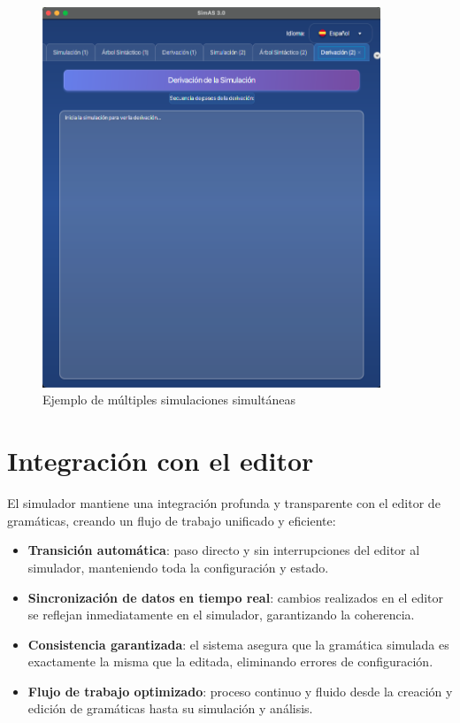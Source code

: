\needspace{8cm}
\begin{figure}[H]
    \centering
    \includegraphics[width=0.9\textwidth]{figuras/simulador/simulacion_varias.png}
    \caption{Ejemplo de múltiples simulaciones simultáneas}
    \label{fig:simulacion_varias}
\end{figure}

\section{Integración con el editor}

El simulador mantiene una integración profunda y transparente con el editor de gramáticas, creando un flujo de trabajo unificado y eficiente:

\begin{itemize}
    \item \textbf{Transición automática}: paso directo y sin interrupciones del editor al simulador, manteniendo toda la configuración y estado.
    \item \textbf{Sincronización de datos en tiempo real}: cambios realizados en el editor se reflejan inmediatamente en el simulador, garantizando la coherencia.
    \item \textbf{Consistencia garantizada}: el sistema asegura que la gramática simulada es exactamente la misma que la editada, eliminando errores de configuración.
    \item \textbf{Flujo de trabajo optimizado}: proceso continuo y fluido desde la creación y edición de gramáticas hasta su simulación y análisis.
\end{itemize}

